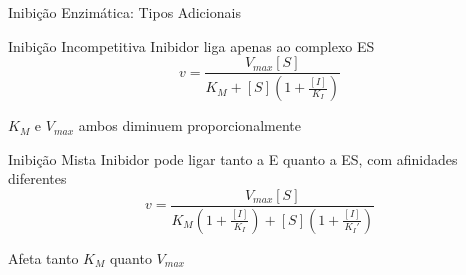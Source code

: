 \begin{frame}[shrink=10]{Inibição Enzimática: Tipos Adicionais}
\begin{block}{Inibição Incompetitiva}
Inibidor liga apenas ao complexo ES
\begin{equation*}
v = \frac{V_{max}[S]}{K_M + [S]\left(1 + \frac{[I]}{K_I}\right)}
\end{equation*}

$K_M$ e $V_{max}$ ambos diminuem proporcionalmente
\end{block}

\begin{block}{Inibição Mista}
Inibidor pode ligar tanto a E quanto a ES, com afinidades diferentes
\begin{equation*}
v = \frac{V_{max}[S]}{K_M\left(1 + \frac{[I]}{K_I}\right) + [S]\left(1 + \frac{[I]}{K_I'}\right)}
\end{equation*}

Afeta tanto $K_M$ quanto $V_{max}$
\end{block}
\end{frame}

